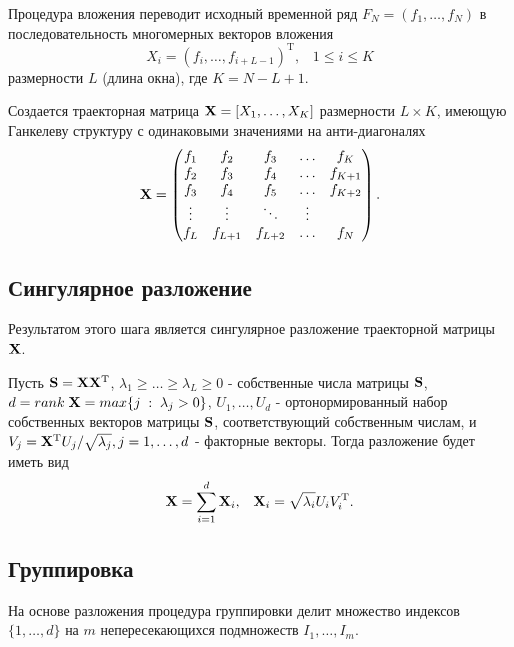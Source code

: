 \documentclass[specialist, substylefile = spbu.rtx,
			   subf, href, 12pt]{disser}
\begin{document}
Процедура вложения переводит исходный временной ряд $F_N = (f_1, \dotsc, f_{N})$ в последовательность многомерных векторов вложения
$$X_i = (f_{i}, \dotsc, f_{i+L-1})^\mathrm{T}, \;\;\; 1 \leq i \leq K$$
размерности $L$ (длина окна), где $K = N - L + 1$. 

Создается траекторная матрица $\bold{X} = [X_1, \dotsc, X_K]$ размерности $L \times K$, имеющую Ганкелеву структуру с одинаковыми значениями на анти-диагоналях
\begin{equation}\label{eq:traj_m}
	\bold{X} =
	\begin{pmatrix}
		f_{1} & f_{2} & f_{3} & \ldots & f_{K}\\
		f_{2} & f_{3} & f_{4} & \ldots & f_{K+1}\\
		f_{3} & f_{4} & f_{5} & \ldots & f_{K+2}\\
		\vdots & \vdots & \ddots & \vdots\\
		f_{L} & f_{L+1} & f_{L+2} & \ldots & f_{N}
	\end{pmatrix}.
\end{equation}

\subsection{Сингулярное разложение}

Результатом этого шага является сингулярное разложение траекторной матрицы $\bold{X}$. 

Пусть $\bold{S} = \bold{X}\bold{X}^\mathrm{T}$, $\lambda_1 \geq \dotsc \geq \lambda_L \geq 0$ - собственные числа матрицы $\bold{S}$, $d = rank\;\bold{X} = max\{j\;:\;\lambda_j > 0\}$, $U_1, \dotsc, U_d$ - ортонормированный набор собственных векторов матрицы $\bold{S}$, соответствующий собственным числам, и $V_j = \bold{X}^\mathrm{T}U_j/\sqrt{\lambda_j}, j = 1, \dotsc, d$ - факторные векторы. Тогда разложение будет иметь вид
\begin{equation}\label{eq:singular_decomp}
	\bold{X} = \sum\limits_{i=1}^{d}\bold{X}_i, \;\;\; \bold{X}_i = \sqrt{\lambda_i}U_iV_i^\mathrm{T}. 
\end{equation}

\subsection{Группировка}

На основе разложения процедура группировки делит множество индексов \newline $\{1, \dotsc, d\}$ на $m$ непересекающихся подмножеств $I_1, \dotsc, I_m$.
\end{document}
